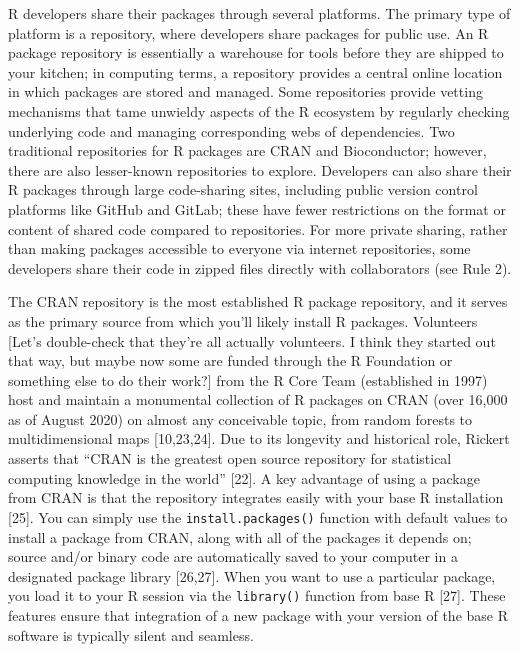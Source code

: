 \documentclass[10pt,letterpaper]{article}
\begin{document}
R developers share their packages through several platforms. The primary
type of platform is a repository, where developers share packages for
public use. An R package repository is essentially a warehouse for tools
before they are shipped to your kitchen; in computing terms, a
repository provides a central online location in which packages are
stored and managed. Some repositories provide vetting mechanisms that
tame unwieldy aspects of the R ecosystem by regularly checking
underlying code and managing corresponding webs of dependencies. Two
traditional repositories for R packages are CRAN and Bioconductor;
however, there are also lesser-known repositories to explore. Developers
can also share their R packages through large code-sharing sites,
including public version control platforms like GitHub and GitLab; these
have fewer restrictions on the format or content of shared code compared
to repositories. For more private sharing, rather than making packages
accessible to everyone via internet repositories, some developers share
their code in zipped files directly with collaborators (see Rule 2).

The CRAN repository is the most established R package repository, and it
serves as the primary source from which you'll likely install R
packages. Volunteers {[}Let's double-check that they're all actually
volunteers. I think they started out that way, but maybe now some are
funded through the R Foundation or something else to do their work?{]}
from the R Core Team (established in 1997) host and maintain a
monumental collection of R packages on CRAN (over 16,000 as of August
2020) on almost any conceivable topic, from random forests to
multidimensional maps {[}10,23,24{]}. Due to its longevity and
historical role, Rickert asserts that ``CRAN is the greatest open source
repository for statistical computing knowledge in the world'' {[}22{]}.
A key advantage of using a package from CRAN is that the repository
integrates easily with your base R installation {[}25{]}. You can simply
use the \texttt{install.packages()} function with default values to
install a package from CRAN, along with all of the packages it depends
on; source and/or binary code are automatically saved to your computer
in a designated package library {[}26,27{]}. When you want to use a
particular package, you load it to your R session via the
\texttt{library()} function from base R {[}27{]}. These features ensure
that integration of a new package with your version of the base R
software is typically silent and seamless.
\end{document}
